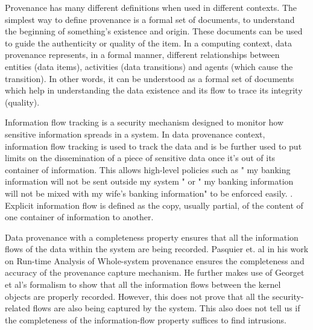 \documentclass{IEEEtran}
\begin{document}
Provenance has many different definitions when used in different contexts. The simplest way to define provenance is a formal set of documents, to understand the beginning of something's existence and origin. These documents can be used to guide the authenticity or quality of the item. In a computing context, data provenance represents, in a formal manner, different relationships between entities (data items), activities (data transitions) and agents (which cause the transition). In other words, it can be understood as a formal set of documents which help in understanding the data existence and its flow to trace its integrity (quality). \cite{b1}

Information flow tracking is a security mechanism designed to monitor how sensitive information spreads in a system. In data provenance context, information flow tracking is used to track the data and is be further used to put limits on the dissemination of a piece of sensitive data once it's out of its container of information. This allows high-level policies such as " my banking information will not be sent outside my system " or " my banking information will not be mixed with my wife's banking information" to be enforced easily.  \cite{b2}. Explicit information flow is defined as the copy, usually partial, of the content of one container of information to another. \cite{b3}

Data provenance with a completeness property ensures that all the information flows of the data within the system are being recorded. Pasquier et. al \cite{b6} in his work on Run-time Analysis of Whole-system provenance ensures the completeness and accuracy of the provenance capture mechanism. He further makes use of Georget et al's \cite{b3} formalism to show that all the information flows between the kernel objects are properly recorded. However, this does not prove that all the security-related flows are also being captured by the system. This also does not tell us if the completeness of the information-flow property suffices to find intrusions.
\end{document}
